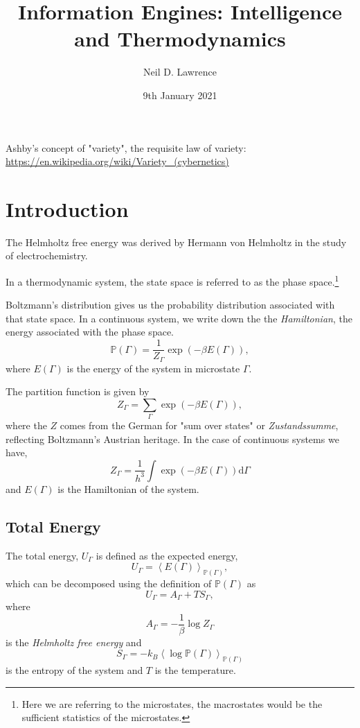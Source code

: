 \documentclass[]{article}
\title{Information Engines: Intelligence and Thermodynamics}
\author{Neil D. Lawrence}
\date{9th January 2021}
\begin{document}
\maketitle


\newcommand{\phaseVariables}{\Gamma}
\newcommand{\stateVariables}{X}
\newcommand{\nullVariables}{X_0}
\newcommand{\domainVariables}{X_1}
\newcommand{\dataVariables}{Y}
\newcommand{\measuredVariables}{S}
\newcommand{\parameterVector}{W}
\newcommand{\expDist}[2]{\left\langle #1 \right\rangle_{#2}}
\newcommand{\trueProb}{\mathbb{P}}
\newcommand{\physicsProb}{p}
\newcommand{\approxProb}{q}
\newcommand{\statsProb}{\pi}


Ashby's concept of "variety", the requisite law of variety: \url{https://en.wikipedia.org/wiki/Variety_(cybernetics)}

\section{Introduction}

The Helmholtz free energy was derived by Hermann von Helmholtz in the
study of electrochemistry.

In a thermodynamic system, the state space is referred to as the phase
space.\footnote{Here we are referring to the microstates, the macrostates would be the sufficient statistics of the microstates.}

Boltzmann's distribution gives us the probability distribution
associated with that state space. In a continuous system, we write down
the the \emph{Hamiltonian}, the energy associated with the phase space.
\[
\mathbb{P}(\phaseVariables) = \frac{1}{Z_\phaseVariables} \exp(-\beta E(\phaseVariables)),
\] 
where \(E(\phaseVariables)\) is the energy of the system in microstate \(\phaseVariables\).

The partition function is given by 
\[
Z_\phaseVariables = \sum_\phaseVariables \exp(-\beta E(\phaseVariables)),
\] 
where the \(Z\) comes from the German for "sum over states" or \emph{Zustandssumme}, reflecting Boltzmann's Austrian heritage. In the case of continuous systems we have, 
\[
Z_{\phaseVariables} = \frac{1}{h^3}\int \exp(-\beta E(\phaseVariables)) \text{d} \phaseVariables
\] 
and \(E(\phaseVariables)\) is the Hamiltonian of the system.

\subsection{Total Energy}

The total energy, \(U_\phaseVariables\) is defined as the expected
energy, 
\[
U_\phaseVariables = \expDist{E(\phaseVariables)}{\trueProb(\phaseVariables)},
\] 
which can be decomposed using the definition of
\(\trueProb(\phaseVariables)\) as 
\[
U_\phaseVariables = A_\phaseVariables + TS_\phaseVariables,
\] 
where 
\[
A_\phaseVariables = - \frac{1}{\beta}\log Z_\phaseVariables
\] 
is the \emph{Helmholtz free energy} and \[
S_\phaseVariables = -k_B \expDist{\log \trueProb(\phaseVariables)}{\trueProb(\phaseVariables)}
\] is the entropy of the system and \(T\) is the temperature.
\end{document}
